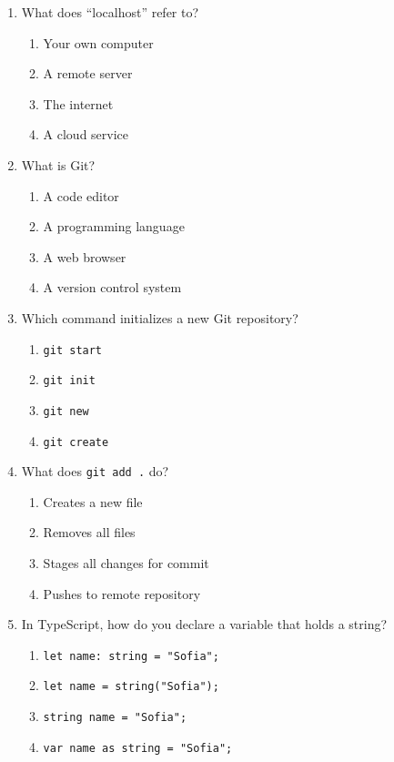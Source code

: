 \documentclass[12pt,a4paper]{article}
\begin{document}
\begin{enumerate}
\item What does ``localhost'' refer to?
\begin{enumerate}[label=\Alph*)]
    \item Your own computer
    \item A remote server
    \item The internet
    \item A cloud service
\end{enumerate}

\item What is Git?
\begin{enumerate}[label=\Alph*)]
    \item A code editor
    \item A programming language
    \item A web browser
    \item A version control system
\end{enumerate}

\item Which command initializes a new Git repository?
\begin{enumerate}[label=\Alph*)]
    \item \texttt{git start}
    \item \texttt{git init}
    \item \texttt{git new}
    \item \texttt{git create}
\end{enumerate}

\item What does \texttt{git add .} do?
\begin{enumerate}[label=\Alph*)]
    \item Creates a new file
    \item Removes all files
    \item Stages all changes for commit
    \item Pushes to remote repository
\end{enumerate}

\item In TypeScript, how do you declare a variable that holds a string?
\begin{enumerate}[label=\Alph*)]
    \item \texttt{let name: string = "Sofia";}
    \item \texttt{let name = string("Sofia");}
    \item \texttt{string name = "Sofia";}
    \item \texttt{var name as string = "Sofia";}
\end{enumerate}


\end{enumerate}
\end{document}
